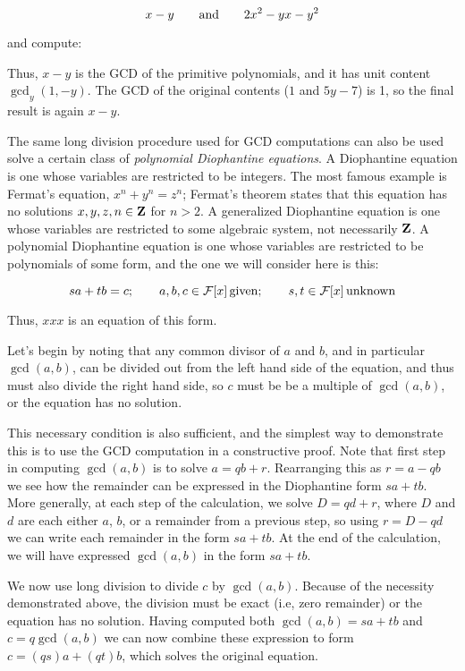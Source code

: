 $$x-y {\rm\qquad and\qquad} 2x^2-yx-y^2$$

and compute:



Thus, $x-y$ is the GCD of the primitive polynomials, and it has unit
content $\gcd_y(1,-y)$.  The GCD of the original contents
($1$ and $5y-7$) is 1, so the final result is again $x-y$.

\vfill\eject


The same long division procedure used for GCD computations can also be
used solve a certain class of {\it polynomial Diophantine equations}.
A Diophantine equation is one whose variables are restricted to be
integers.  The most famous example is Fermat's equation,
$x^n+y^n=z^n$; Fermat's theorem states that this equation has no
solutions $x,y,z,n\in{\bf Z}$ for $n>2$.  A generalized Diophantine
equation is one whose variables are restricted to some algebraic
system, not necessarily ${\bf Z}$.  A polynomial Diophantine equation
is one whose variables are restricted to be polynomials of some form,
and the one we will consider here is this:

\begin{displaymath}
sa+tb=c; \qquad a,b,c\in{\cal F}[x] {\rm\, given}; \qquad
s,t\in{\cal F}[x] {\rm\, unknown}
\end{displaymath}

Thus, $xxx$ is an equation of this form.

Let's begin by noting that any common divisor of $a$ and $b$, and in
particular $\gcd(a,b)$, can be divided out from the left hand side of
the equation, and thus must also divide the right hand side, so $c$
must be be a multiple of $\gcd(a,b)$, or the equation has no solution.

This necessary condition is also sufficient, and the simplest way to
demonstrate this is to use the GCD computation in a constructive
proof.  Note that first step in computing $\gcd(a,b)$ is to solve
$a=qb+r$.  Rearranging this as $r=a-qb$ we see how the remainder can
be expressed in the Diophantine form $sa+tb$.  More generally, at each
step of the calculation, we solve $D=qd+r$, where $D$ and $d$ are each
either $a$, $b$, or a remainder from a previous step, so using
$r=D-qd$ we can write each remainder in the form $sa+tb$.  At the end
of the calculation, we will have expressed $\gcd(a,b)$ in the form
$sa+tb$.

We now use long division to divide $c$ by $\gcd(a,b)$.  Because of the
necessity demonstrated above, the division must be exact (i.e, zero
remainder) or the equation has no solution.  Having computed both
$\gcd(a,b)=sa+tb$ and $c=q\gcd(a,b)$ we can now combine these
expression to form $c=(qs)a+(qt)b$, which solves the original
equation.

